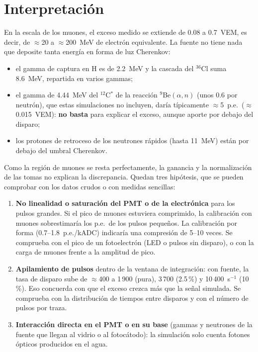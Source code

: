 \documentclass[11pt,a4paper]{article}
\begin{document}
\section{Interpretación}
En la escala de los muones, el exceso medido se extiende de 0.08 a 0.7~VEM, es decir, de $\approx$20 a
$\approx$200~MeV de electrón equivalente. La fuente no tiene nada que deposite tanta energía en forma de luz
Cherenkov:
\begin{itemize}
\item el gamma de captura en H es de 2.2~MeV y la cascada del $^{36}$Cl suma 8.6~MeV, repartida en varios
gammas;
\item el gamma de 4.44~MeV del $^{12}$C$^*$ de la reacción $^9$Be$(\alpha,n)$ (unos 0.6 por neutrón), que
estas simulaciones no incluyen, daría típicamente $\approx$5~p.e.\ ($\approx$0.015~VEM): \textbf{no basta}
para explicar el exceso, aunque aporte por debajo del disparo;
\item los protones de retroceso de los neutrones rápidos (hasta 11~MeV) están por debajo del umbral
Cherenkov.
\end{itemize}

Como la región de muones se resta perfectamente, la ganancia y la normalización de las tomas no explican la
discrepancia. Quedan tres hipótesis, que se pueden comprobar con los datos crudos o con medidas sencillas:
\begin{enumerate}
\item \textbf{No linealidad o saturación del PMT o de la electrónica} para los pulsos grandes. Si el pico de
muones estuviera comprimido, la calibración con muones sobrestimaría los p.e.\ de los pulsos pequeños. La
calibración por forma (0.7--1.8~p.e./kADC) indicaría una compresión de 5--10 veces. Se comprueba con el
pico de un fotoelectrón (LED o pulsos sin disparo), o con la carga de muones frente a la amplitud de pico.
\item \textbf{Apilamiento de pulsos} dentro de la ventana de integración: con fuente, la tasa de disparo sube
de $\approx$400 a 1\,900 (pura), 3\,700 (2.5\,\%) y 10\,400~s$^{-1}$ (10\,\%). Eso concuerda con que el exceso
crezca más que la señal simulada. Se comprueba con la distribución de tiempos entre disparos y con el número de
pulsos por traza.
\item \textbf{Interacción directa en el PMT o en su base} (gammas y neutrones de la fuente que llegan al
vidrio o al fotocátodo): la simulación solo cuenta fotones ópticos producidos en el agua.
\end{enumerate}
\end{document}
